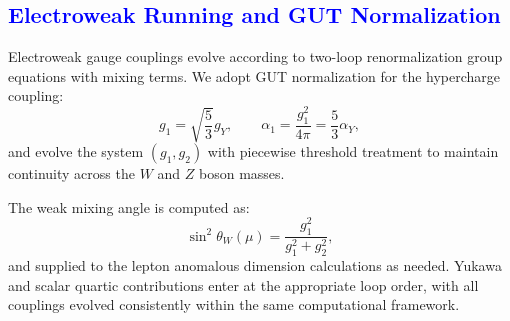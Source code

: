 \documentclass[%
amsmath,amssymb,
aps,
prb,
floatfix, showkeys, 10pt,
]{revtex4-2}
\newcommand{\modif}[1]{\textcolor{blue}{#1}}
\begin{document}
{\modif{\subsection{Electroweak Running and GUT Normalization}
\label{subsec:ew_running}  }}
Electroweak gauge couplings evolve according to two-loop renormalization group equations with mixing terms. We adopt GUT normalization for the hypercharge coupling:
\begin{equation}
g_1 = \sqrt{\frac{5}{3}} g_Y, \qquad \alpha_1 = \frac{g_1^2}{4\pi} = \frac{5}{3}\alpha_Y,
\label{eq:gut_normalization}
\end{equation}
and evolve the system $(g_1, g_2)$ with piecewise threshold treatment to maintain continuity across the $W$ and $Z$ boson masses.

The weak mixing angle is computed as:
\begin{equation}
\sin^2\theta_W(\mu) = \frac{g_1^2}{g_1^2 + g_2^2},
\label{eq:weak_mixing_angle}
\end{equation}
and supplied to the lepton anomalous dimension calculations as needed. Yukawa and scalar quartic contributions enter at the appropriate loop order, with all couplings evolved consistently within the same computational framework.
\end{document}
